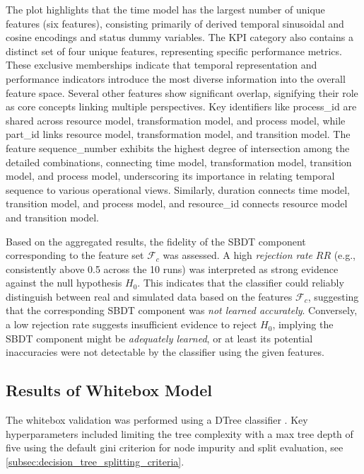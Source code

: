 The plot highlights that the time model has the largest number of unique features (six features), consisting primarily of derived temporal sinusoidal and cosine encodings and status dummy variables. The KPI category also contains a distinct set of four unique features, representing specific performance metrics. These exclusive memberships indicate that temporal representation and performance indicators introduce the most diverse information into the overall feature space.
Several other features show significant overlap, signifying their role as core concepts linking multiple perspectives. Key identifiers like process\_id are shared across resource model, transformation model, and process model, while part\_id links resource model, transformation model, and transition model. The feature sequence\_number exhibits the highest degree of intersection among the detailed combinations, connecting time model, transformation model, transition model, and process model, underscoring its importance in relating temporal sequence to various operational views. Similarly, duration connects time model, transition model, and process model, and resource\_id connects resource model and transition model.

Based on the aggregated results, the fidelity of the SBDT component corresponding to the feature set $\mathcal{F}_c$ was assessed. A high \textit{rejection rate} $RR$ (e.g., consistently above 0.5 across the 10 runs) was interpreted as strong evidence against the null hypothesis $H_0$. This indicates that the classifier could reliably distinguish between real and simulated data based on the features $\mathcal{F}_c$, suggesting that the corresponding SBDT component was \textit{not learned accurately}. Conversely, a low rejection rate suggests insufficient evidence to reject $H_0$, implying the SBDT component might be \textit{adequately learned}, or at least its potential inaccuracies were not detectable by the classifier using the given features.

\subsection*{Results of Whitebox Model}
\label{sec:results-whitebox}
The whitebox validation was performed using a DTree classifier \autocite{Scikit-Learn}. Key hyperparameters included limiting the tree complexity with a max tree depth of five using the default gini criterion for node impurity and split evaluation, see \autoref{subsec:decision_tree_splitting_criteria}.

